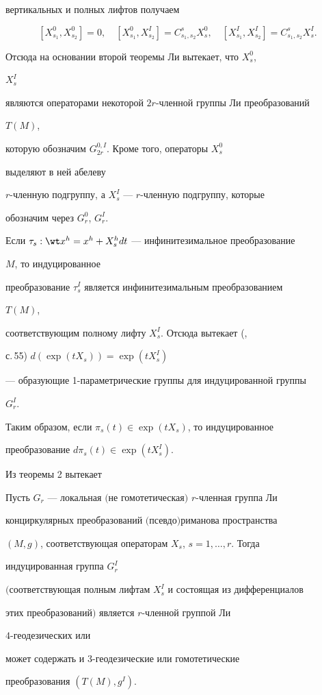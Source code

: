 вертикальных и полных лифтов получаем


$$


[X^0_{s_1},X^0_{s_2}]=0,\quad


[X^0_{s_1},X^I_{s_2}]=C^s_{s_1,s_2}X^0_s,\quad


[X^I_{s_1},X^I_{s_2}]=C^s_{s_1,s_2}X^I_s.


$$


Отсюда на основании второй теоремы Ли \cite{15} вытекает, что $X^0_s$,


$X^I_s$


являются операторами некоторой $2r$-членной группы Ли преобразований


$T(M)$,


которую обозначим $G^{0,I}_{2r}$. Кроме того, операторы $X^0_s$


выделяют в ней абелеву


$r$-членную подгруппу, а $X^I_s$ --- $r$-членную подгруппу, которые


обозначим через $G^0_r$, $G^I_r$.





Если $\tau_s:\wt x^h=x^h+X^h_s dt$ --- инфинитезимальное преобразование


$M$, то индуцированное


преобразование $\tau^I_s$ является инфинитезимальным преобразованием


$T(M)$,


соответствующим полному лифту $X^I_s$. Отсюда вытекает (\cite{5},


с.\,55) $d(\exp(t X_s))=\exp(t X^I_s)$


--- образующие 1-параметрические группы для индуцированной группы


$G^I_r$.


Таким образом, если $\pi_s(t)\in\exp(t X_s)$, то индуцированное


преобразование $d\pi_s(t)\in\exp(t X^I_s)$.


Из теоремы 2 вытекает





\begin{thm}


Пусть $G_r$ --- локальная $($не гомотетическая$)$ $r$-членная группа Ли


конциркулярных преобразований $($псевдо$)$риманова пространства


$(M,g)$, соответствующая операторам $X_s$, $s=1,\dotsc,r$. Тогда


индуцированная группа $G^I_r$


$($соответствующая полным лифтам $X^I_s$ и состоящая из дифференциалов


этих преобразований$)$ является $r$-членной группой Ли


$4$-геодезических или


может содержать и $3$-геодезические или гомотетические


преобразования $(T(M),g^I)$.


\end{thm}





